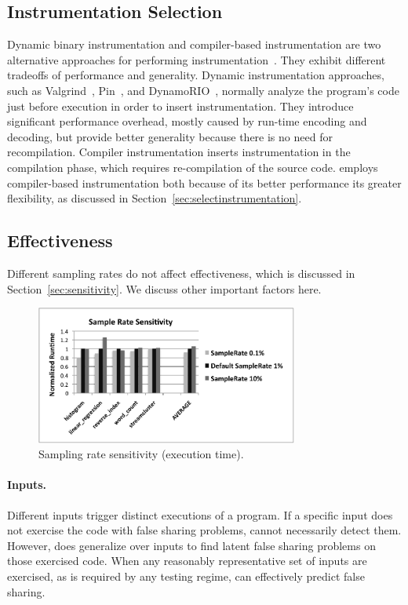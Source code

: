 \label{sec:discussion}

\subsection{Instrumentation Selection}
\label{sec:instrumentationtradeoff}
Dynamic binary instrumentation and compiler-based instrumentation are two alternative approaches for performing instrumentation~\cite{Instrumentation}. They exhibit different tradeoffs of performance and generality. Dynamic instrumentation approaches, such as Valgrind~\cite{Valgrind}, Pin~\cite{Pin}, and DynamoRIO~\cite{DynamoRIO}, normally analyze the program's code just before execution in order to insert instrumentation. They introduce significant performance overhead, mostly caused by run-time encoding and decoding, but provide better generality because there is no need for recompilation. Compiler instrumentation inserts instrumentation in the compilation phase, which requires re-compilation of the source code. 
\Predator{} employs compiler-based instrumentation both because of its better performance its greater flexibility, as discussed in Section~\ref{sec:selectinstrumentation}.

\subsection{Effectiveness}
Different sampling rates do not affect effectiveness, which is discussed in Section~\ref{sec:sensitivity}. We discuss other important factors here. 

\begin{figure}[!t]
\centering 
\includegraphics[width=3.4in]{fig/sample}
\caption{Sampling rate sensitivity (execution time).}
\label{fig:sample}
\end{figure}

\paragraph{Inputs.} Different inputs trigger distinct executions of a program. If a specific input does not exercise the code with false sharing problems, \Predator{} cannot necessarily detect them. However, \Predator{} does generalize over inputs to find latent false sharing problems on those exercised code. When any reasonably representative set of inputs are exercised, as is required by any testing regime, \Predator{} can effectively predict false sharing.

